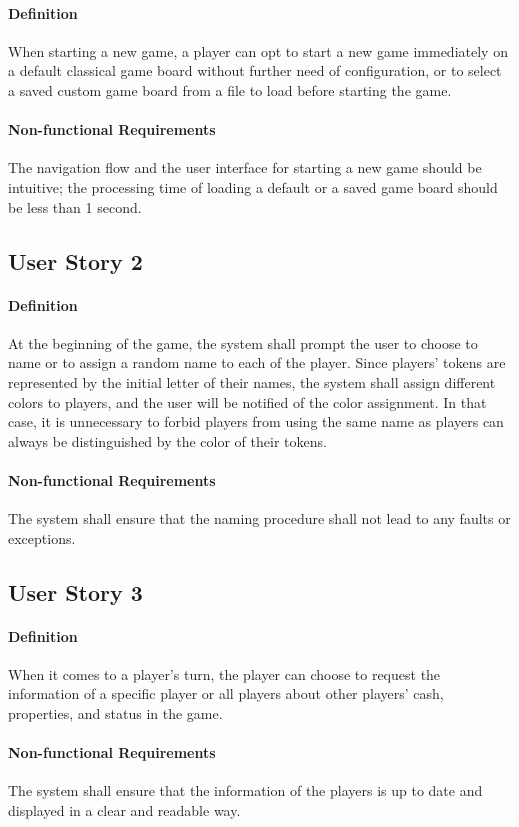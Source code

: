 \documentclass{article}
\begin{document}
\paragraph{Definition} When starting a new game, a player can opt to start a new game immediately on a default classical 
game board without further need of configuration, or to select a saved custom game board from a file to load before starting the game.
\paragraph{Non-functional Requirements} The navigation flow and the user interface for starting a new game should be intuitive; the processing time of 
loading a default or a saved game board should be less than 1 second.

\subsection{User Story 2}
\paragraph{Definition} At the beginning of the game, the system shall prompt the user to choose to name or to assign a random name to each of the player.
Since players' tokens are represented by the initial letter of their names, the system shall assign different colors to players, and the user will be notified of the color assignment.
In that case, it is unnecessary to forbid players from using the same name as players can always be distinguished by the color of their tokens.
\paragraph{Non-functional Requirements} The system shall ensure that the naming procedure shall not lead to any faults or exceptions.

\subsection{User Story 3}
\paragraph{Definition} When it comes to a player's turn, the player can choose to request the information of a specific player or all players 
about other players' cash, properties, and status in the game.
\paragraph{Non-functional Requirements} The system shall ensure that the information of the players is up to date and displayed in a clear and readable way.
\end{document}
